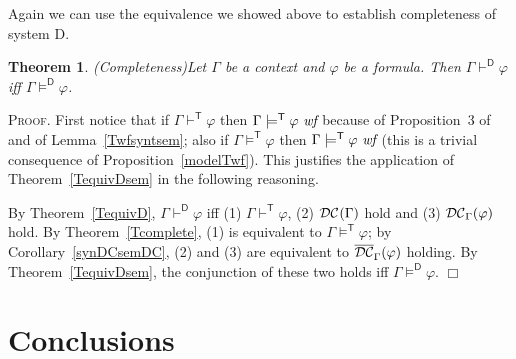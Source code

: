 \documentclass{article}
\newtheorem{theorem}[definition]{Theorem}
\newenvironment{proof}{\smallskip\textsc{Proof.}}{\hspace*{\fill}$\Box$}
\newcommand{\D}{\textsf D}
\newcommand{\wf}{\ \mbox{\em wf}}
\newcommand{\myvdash}[1]{\ensuremath{\vdash^{\mathsf{#1}}}}
\newcommand{\yields}[1]{\ensuremath{\models^{\mathsf{#1}}}}
\newcommand{\synDC}[1][{}]{\ifthenelse{\equal{#1}{}}{%
{\ensuremath{{\cal{DC}}}}}{%
{\ensuremath{{\cal{DC}}_{#1}}}}}
\newcommand{\semDC}[2][{\mathfrak M},\rho]{\ensuremath{\overline{\cal{DC}}^{#1}_{#2}}}
\begin{document}
Again we can use the equivalence we showed above to establish completeness
of system {\D}.
\begin{theorem}\emph{(Completeness)}\label{Dcomplete}
Let $\Gamma$ be a context and $\varphi$ be a formula.
Then $\Gamma\myvdash{D}\varphi$ iff $\Gamma\yields{D}\varphi$.
\end{theorem}
\begin{proof}
First notice that if $\Gamma\myvdash{T}\varphi$ then
$\Gamma\yields{T}\varphi\wf$ because of Proposition~3
of~\cite{wie:zwa:03} and of Lemma~\ref{Twfsyntsem}; also if
$\Gamma\yields{T}\varphi$ then $\Gamma\yields{T}\varphi\wf$
(this is a trivial consequence of Proposition~\ref{modelTwf}).
This justifies the application of Theorem~\ref{TequivDsem} in the
following reasoning.

By Theorem~\ref{TequivD}, $\Gamma\myvdash{D}\varphi$ iff (1)
$\Gamma\myvdash{T}\varphi$, (2) $\synDC(\Gamma)$ hold and
(3) $\synDC[\Gamma](\varphi)$ hold.  By Theorem~\ref{Tcomplete},
(1) is equivalent to $\Gamma\yields{T}\varphi$; by
Corollary~\ref{synDCsemDC}, (2) and (3) are equivalent to
$\semDC[{}]{\Gamma}(\varphi)$ holding.  By Theorem~\ref{TequivDsem},
the conjunction of these two holds iff $\Gamma\yields{D}\varphi$.
\end{proof}

\section{Conclusions}




\end{document}
